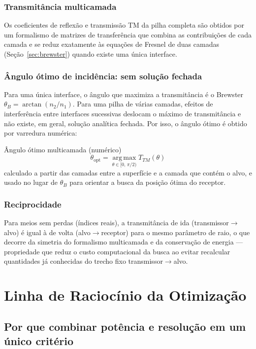 \documentclass[11pt,a4paper]{article}
\newcommand{\thetaB}{\theta_B}
\begin{document}
\subsubsection{Transmitância multicamada}
Os coeficientes de reflexão e transmissão TM da pilha completa são obtidos por um formalismo de
matrizes de transferência que combina as contribuições de cada camada e se reduz exatamente às
equações de Fresnel de duas camadas (Seção~\ref{sec:brewster}) quando existe uma única interface.

\subsubsection{Ângulo ótimo de incidência: sem solução fechada}
Para uma única interface, o ângulo que maximiza a transmitância é o Brewster $\thetaB=\arctan(n_2/n_1)$.
Para uma pilha de várias camadas, efeitos de interferência entre interfaces sucessivas deslocam o
máximo de transmitância e não existe, em geral, solução analítica fechada. Por isso, o ângulo
ótimo é obtido por varredura numérica:
\begin{resultado}{Ângulo ótimo multicamada (numérico)}
\[
\theta_{\mathrm{opt}} = \operatorname*{arg\,max}_{\theta\in[0,\,\pi/2)} T_{TM}(\theta)
\]
calculado a partir das camadas entre a superfície e a camada que contém o alvo, e usado no lugar
de $\thetaB$ para orientar a busca da posição ótima do receptor.
\end{resultado}

\subsubsection{Reciprocidade}
Para meios sem perdas (índices reais), a transmitância de ida (transmissor$\to$alvo) é igual à de
volta (alvo$\to$receptor) para o mesmo parâmetro de raio, o que decorre da simetria do formalismo
multicamada e da conservação de energia — propriedade que reduz o custo computacional da busca ao
evitar recalcular quantidades já conhecidas do trecho fixo transmissor$\to$alvo.

\section{Linha de Raciocínio da Otimização}

\subsection{Por que combinar potência e resolução em um único critério}
\label{sec:custo}
\end{document}
